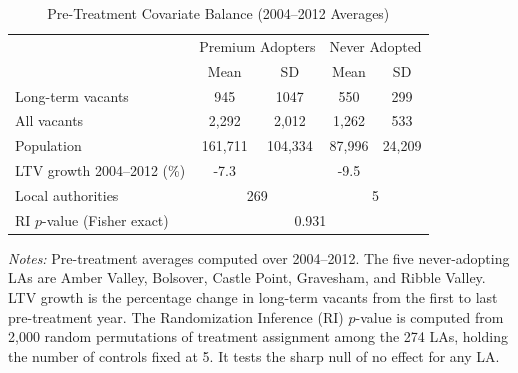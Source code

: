 \begin{table}[H]
\centering
\caption{Pre-Treatment Covariate Balance (2004--2012 Averages)}
\begin{threeparttable}
\begin{tabular}{lcccc}
\toprule
 & \multicolumn{2}{c}{Premium Adopters} & \multicolumn{2}{c}{Never Adopted} \\
 & Mean & SD & Mean & SD \\
\midrule
Long-term vacants & 945 & 1047 & 550 & 299 \\
All vacants & 2,292 & 2,012 & 1,262 & 533 \\
Population & 161,711 & 104,334 & 87,996 & 24,209 \\
LTV growth 2004--2012 (\%) & -7.3 & & -9.5 & \\
\midrule
Local authorities & \multicolumn{2}{c}{269} & \multicolumn{2}{c}{5} \\
\midrule
RI $p$-value (Fisher exact) & \multicolumn{4}{c}{0.931} \\
\bottomrule
\end{tabular}
\begin{tablenotes}[flushleft]
\small
\item \emph{Notes:} Pre-treatment averages computed over 2004--2012. The five never-adopting LAs are Amber Valley, Bolsover, Castle Point, Gravesham, and Ribble Valley. LTV growth is the percentage change in long-term vacants from the first to last pre-treatment year. The Randomization Inference (RI) $p$-value is computed from 2,000 random permutations of treatment assignment among the 274 LAs, holding the number of controls fixed at 5. It tests the sharp null of no effect for any LA.
\end{tablenotes}
\end{threeparttable}
\label{tab:balance}
\end{table}

